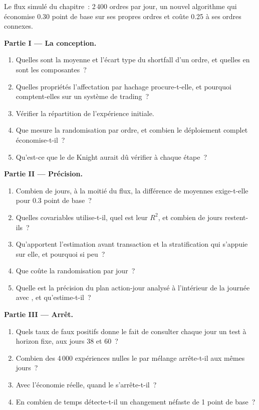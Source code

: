 \begin{problem}\label{pb:rs:live-experiments:1}
Le flux simulé du chapitre~: 2\,400 ordres par jour, un nouvel algorithme qui économise 0.30 point de base sur ses propres ordres et coûte 0.25 à ses ordres connexes.

\medskip\noindent\textbf{Partie I --- La conception.}
\begin{enumerate}
\item Quelles sont la moyenne et l'écart type du shortfall d'un ordre, et quelles en sont les composantes~?
\item Quelles propriétés l'affectation par hachage procure-t-elle, et pourquoi comptent-elles sur un système de trading~?
\item Vérifier la répartition de l'expérience initiale.
\item Que mesure la randomisation par ordre, et combien le déploiement complet économise-t-il~?
\item Qu'est-ce que le  de Knight aurait dû vérifier à chaque étape~?
\end{enumerate}

\medskip\noindent\textbf{Partie II --- Précision.}
\begin{enumerate}[resume]
\item Combien de jours, à la moitié du flux, la différence de moyennes exige-t-elle pour 0.3 point de base~?
\item Quelles covariables  utilise-t-il, quel est leur $R^2$, et combien de jours restent-ils~?
\item Qu'apportent l'estimation avant transaction et la stratification qui s'appuie sur elle, et pourquoi si peu~?
\item Que coûte la randomisation par jour~?
\item Quelle est la précision du plan action-jour analysé à l'intérieur de la journée avec , et qu'estime-t-il~?
\end{enumerate}

\medskip\noindent\textbf{Partie III --- Arrêt.}
\begin{enumerate}[resume]
\item Quels taux de faux positifs donne le fait de consulter chaque jour un test à horizon fixe, aux jours 38 et 60~?
\item Combien des 4\,000 expériences nulles le  par mélange arrête-t-il aux mêmes jours~?
\item Avec l'économie réelle, quand le  s'arrête-t-il~?
\item En combien de temps détecte-t-il un changement néfaste de 1 point de base~?
\end{enumerate}


\end{problem}

